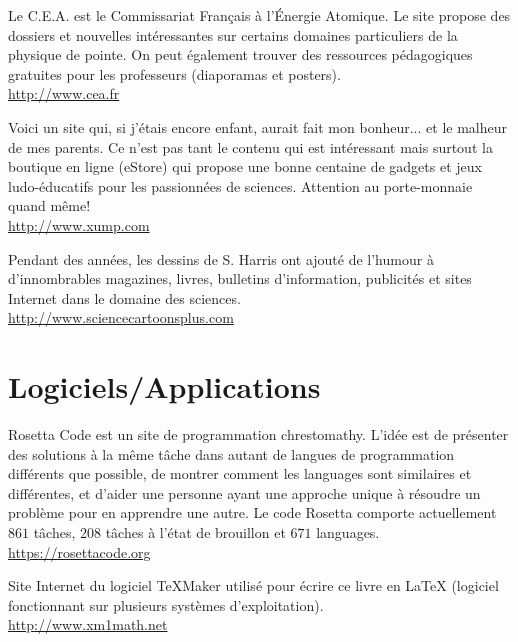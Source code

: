 	{\Large {}}{\Large {}}\bcdfrance{} Le C.E.A. est le Commissariat Français à l'Énergie Atomique. Le site propose des dossiers et nouvelles intéressantes sur certains domaines particuliers de la physique de pointe. On peut également trouver des ressources pédagogiques gratuites pour les professeurs (diaporamas et posters).\\
	\href{http://www.cea.fr}{\color{blue}http://www.cea.fr}
	
	{\Large {}}{\Large {}} Voici un site qui, si j'étais encore enfant, aurait fait mon bonheur... et le malheur de mes parents. Ce n'est pas tant le contenu qui est intéressant mais surtout la boutique en ligne (eStore) qui propose une bonne centaine de gadgets et jeux ludo-éducatifs pour les passionnées de sciences. Attention au porte-monnaie quand même!\\
	\href{http://www.xump.com}{\color{blue}http://www.xump.com}
	
	{\Large {}}{\Large {}} Pendant des années, les dessins de S. Harris ont ajouté de l'humour à d'innombrables magazines, livres, bulletins d'information, publicités et sites Internet dans le domaine des sciences.\\
	\href{http://www.sciencecartoonsplus.com}{\color{blue}http://www.sciencecartoonsplus.com}
	
	\pagebreak
	\section{Logiciels/Applications}
	{\Large {}}{\Large {}}{\Large {}} Rosetta Code est un site de programmation chrestomathy. L'idée est de présenter des solutions à la même tâche dans autant de langues de programmation différents que possible, de montrer comment les languages sont similaires et différentes, et d'aider une personne ayant une approche unique à résoudre un problème pour en apprendre une autre. Le code Rosetta comporte actuellement $861$ tâches, $208$ tâches à l'état de brouillon et $671$ languages.\\
	\href{https://rosettacode.org/wiki/Category:Programming_Tasks}{\color{blue}https://rosettacode.org}
	
	{\Large {}}{\Large {}}{\Large {}}{\Large {}} Site Internet du logiciel TeXMaker utilisé pour écrire ce livre en \LaTeX{} (logiciel fonctionnant sur plusieurs systèmes d'exploitation).\\
	\href{http://www.xm1math.net/texmaker/index.html}{\color{blue}http://www.xm1math.net}
	
